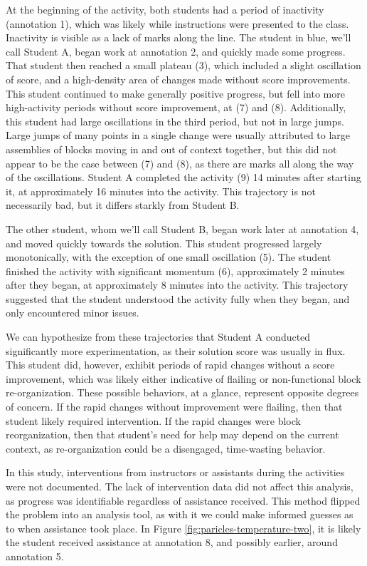 At the beginning of the activity, both students had a period of inactivity (annotation 1), which was likely while instructions were presented to the class. Inactivity is visible as a lack of marks along the line. The student in blue, we'll call Student A, began work at annotation 2, and quickly made some progress. That student then reached a small plateau (3), which included a slight oscillation of score, and a high-density area of changes made without score improvements. This student continued to make generally positive progress, but fell into more high-activity periods without score improvement, at (7) and (8). Additionally, this student had large oscillations in the third period, but not in large jumps. Large jumps of many points in a single change were usually attributed to large assemblies of blocks moving in and out of context together, but this did not appear to be the case between (7) and (8), as there are marks all along the way of the oscillations. Student A completed the activity (9) 14 minutes after starting it, at approximately 16 minutes into the activity. This trajectory is not necessarily bad, but it differs starkly from Student B.

The other student, whom we'll call Student B, began work later at annotation 4, and moved quickly towards the solution. This student progressed largely monotonically, with the exception of one small oscillation (5). The student finished the activity with significant momentum (6), approximately 2 minutes after they began, at approximately 8 minutes into the activity. This trajectory suggested that the student understood the activity fully when they began, and only encountered minor issues. 

We can hypothesize from these trajectories that Student A conducted significantly more experimentation, as their solution score was usually in flux. This student did, however, exhibit periods of rapid changes without a score improvement, which was likely either indicative of flailing or non-functional block re-organization. These possible behaviors, at a glance, represent opposite degrees of concern. If the rapid changes without improvement were flailing, then that student likely required intervention. If the rapid changes were block reorganization, then that student's need for help may depend on the current context, as re-organization could be a disengaged, time-wasting behavior. %

In this study, interventions from instructors or assistants during the activities were not documented. The lack of intervention data did not affect this analysis, as progress was identifiable regardless of assistance received. This method flipped the problem into an analysis tool, as with it we could make informed guesses as to when assistance took place. In Figure \ref{fig:paricles-temperature-two}, it is likely the student received assistance at annotation 8, and possibly earlier, around annotation 5. 

